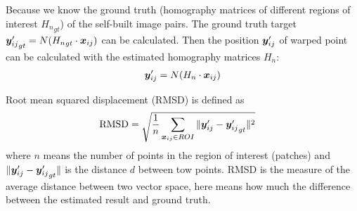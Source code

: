 \begin{definition}\label{def:RMSD}
	Because we know the ground truth (homography matrices of different regions of interest ${H_n}_{gt}$) of the self-built image pairs. The ground truth target ${\boldsymbol{y}'_{ij}}_{gt}= N({H_n}_{gt} \cdot \boldsymbol{x}_{ij})$ can be calculated. Then the position $\boldsymbol{y}'_{ij}$ of warped point can be calculated with the estimated homography matrices $H_n$:
	\begin{align}
		\boldsymbol{y}'_{ij} = N(H_n \cdot \boldsymbol{x}_{ij})
	\end{align}

	Root mean squared displacement (RMSD) is defined as
	\begin{align}
	\mathrm{RMSD} & = \sqrt{\frac{1}{n}\sum_{\boldsymbol{x}_{ij}\in ROI} \|\boldsymbol{y}'_{ij} - {\boldsymbol{y}'_{ij}}_{gt} \|^2}
	\end{align}
	where $n$ means the number of points in the region of interest (patches) and $\|\boldsymbol{y}'_{ij} - {\boldsymbol{y}'_{ij}}_{gt} \|$ is the distance $d$ between tow points. RMSD is the measure of the average distance between two vector space, here means how much the difference between the estimated result and ground truth.
\end{definition}
	
